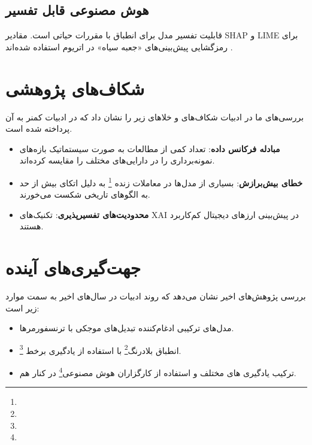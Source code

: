 \subsection{هوش مصنوعی قابل تفسیر }
قابلیت تفسیر مدل برای انطباق با مقررات حیاتی است. مقادیر SHAP و LIME برای رمزگشایی پیش‌بینی‌های «جعبه سیاه» در اتریوم استفاده شده‌اند \cite{antulov2022explainable}.

\section{شکاف‌های پژوهشی}
بررسی‌های ما در ادبیات شکاف‌های و خلا‌های زیر را نشان داد که در ادبیات کمنر به آن پرداخته شده است.
\label{sec:critique}
\begin{itemize}
	\item \textbf{مبادله فرکانس داده}: تعداد کمی از مطالعات به صورت سیستماتیک بازه‌های نمونه‌برداری را در دارایی‌های مختلف  را مقایسه کرده‌اند.
	\item \textbf{خطای بیش‌برازش}: بسیاری از مدل‌ها در معاملات زنده \footnote{} به دلیل اتکای بیش از حد به الگوهای تاریخی شکست می‌خورند.
	\item \textbf{محدودیت‌های تفسیرپذیری}: تکنیک‌های XAI در پیش‌بینی ارزهای دیجیتال کم‌کاربرد هستند.
\end{itemize}


\section{جهت‌گیری‌های آینده}
بررسی پژوهش‌های اخیر نشان می‌دهد که روند ادبیات در سال‌های اخیر به سمت موارد زیر است:
\label{sec:future}
\begin{itemize}
	\item مدل‌های ترکیبی ادغام‌کننده تبدیل‌های موجکی با ترنسفورمرها.
	\item انطباق بلادرنگ\footnote{} با استفاده از یادگیری برخط \footnote{}.
	\item ترکیب‌ یادگیری های مختلف و استفاده از کارگزاران هوش مصنوعی\footnote{} در کنار هم. 
	
\end{itemize}


